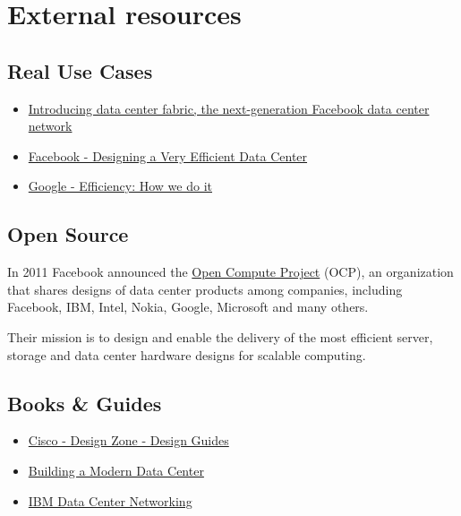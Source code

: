 
\chapter{External resources}

\hypertarget{real-use-cases}{%
\section{Real Use Cases}\label{real-use-cases}}

\begin{itemize}
\item
  \href{https://code.fb.com/production-engineering/introducing-data-center-fabric-the-next-generation-facebook-data-center-network/}{Introducing
  data center fabric, the next-generation Facebook data center network}
\item
  \href{https://www.facebook.com/notes/facebook-engineering/designing-a-very-efficient-data-center/10150148003778920/}{Facebook
  - Designing a Very Efficient Data Center}
\item
  \href{https://www.google.com/about/datacenters/efficiency/internal/}{Google
  - Efficiency: How we do it}
\end{itemize}

\hypertarget{open-source}{%
\section{Open Source}\label{open-source}}

In 2011 Facebook announced the \href{https://www.opencompute.org}{Open
Compute Project} (OCP), an organization that shares designs of data
center products among companies, including Facebook, IBM, Intel, Nokia,
Google, Microsoft and many others.

Their mission is to design and enable the delivery of the most efficient
server, storage and data center hardware designs for scalable computing.

\hypertarget{books-guides}{%
\section{Books \& Guides}\label{books-guides}}

\begin{itemize}
\item
  \href{https://www.cisco.com/c/en/us/solutions/design-zone.html}{Cisco
  - Design Zone - Design Guides}
\item
  \href{https://www.actualtechmedia.com/wp-content/uploads/2018/05/Building-a-Modern-Data-Center-ebook.pdf}{Building
  a Modern Data Center}
\item
  \href{http://www.redbooks.ibm.com/redbooks/pdfs/sg247928.pdf}{IBM Data
  Center Networking}
\end{itemize}

